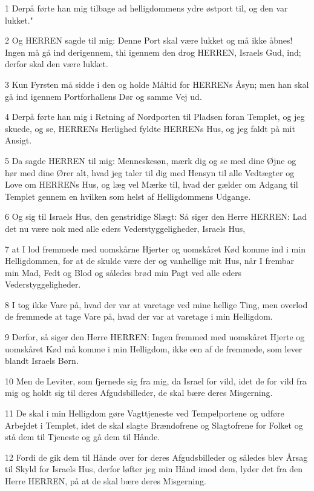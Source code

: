 \par 1 Derpå førte han mig tilbage ad helligdommens ydre østport til, og den var lukket."
\par 2 Og HERREN sagde til mig: Denne Port skal være lukket og må ikke åbnes! Ingen må gå ind derigennem, thi igennem den drog HERREN, Israels Gud, ind; derfor skal den være lukket.
\par 3 Kun Fyrsten må sidde i den og holde Måltid for HERRENs Åsyn; men han skal gå ind igennem Portforhallens Dør og samme Vej ud.
\par 4 Derpå førte han mig i Retning af Nordporten til Pladsen foran Templet, og jeg skuede, og se, HERRENs Herlighed fyldte HERRENs Hus, og jeg faldt på mit Ansigt.
\par 5 Da sagde HERREN til mig: Menneskesøn, mærk dig og se med dine Øjne og hør med dine Ører alt, hvad jeg taler til dig med Hensyn til alle Vedtægter og Love om HERRENs Hus, og læg vel Mærke til, hvad der gælder om Adgang til Templet gennem en hvilken som helst af Helligdommens Udgange.
\par 6 Og sig til Israels Hus, den genstridige Slægt: Så siger den Herre HERREN: Lad det nu være nok med alle eders Vederstyggeligheder, Israels Hus,
\par 7 at I lod fremmede med uomskårne Hjerter og uomskåret Kød komme ind i min Helligdommen, for at de skulde være der og vanhellige mit Hus, når I frembar min Mad, Fedt og Blod og således brød min Pagt ved alle eders Vederstyggeligheder.
\par 8 I tog ikke Vare på, hvad der var at varetage ved mine hellige Ting, men overlod de fremmede at tage Vare på, hvad der var at varetage i min Helligdom.
\par 9 Derfor, så siger den Herre HERREN: Ingen fremmed med uomskåret Hjerte og uomskåret Kød må komme i min Helligdom, ikke een af de fremmede, som lever blandt Israels Børn.
\par 10 Men de Leviter, som fjernede sig fra mig, da Israel for vild, idet de for vild fra mig og holdt sig til deres Afgudsbilleder, de skal bære deres Misgerning.
\par 11 De skal i min Helligdom gøre Vagttjeneste ved Tempelportene og udføre Arbejdet i Templet, idet de skal slagte Brændofrene og Slagtofrene for Folket og stå dem til Tjeneste og gå dem til Hånde.
\par 12 Fordi de gik dem til Hånde over for deres Afgudsbilleder og således blev Årsag til Skyld for Israels Hus, derfor løfter jeg min Hånd imod dem, lyder det fra den Herre HERREN, på at de skal bære deres Misgerning.
